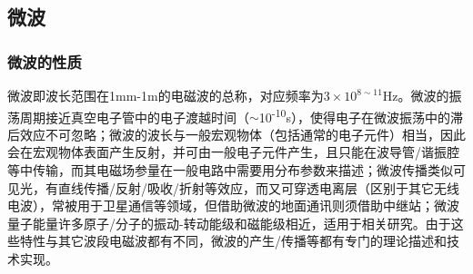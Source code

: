 \subsection{微波} %
	\label{sub:微波}
	\subsubsection{微波的性质} %
		\label{ssub:微波的性质}
		\par 微波即波长范围在1mm-1m的电磁波的总称，对应频率为$3\times 10^{8\sim 11}$Hz。微波的振荡周期接近真空电子管中的电子渡越时间（$\sim$10\textsuperscript{-10}s），使得电子在微波振荡中的滞后效应不可忽略；微波的波长与一般宏观物体（包括通常的电子元件）相当，因此会在宏观物体表面产生反射，并可由一般电子元件产生，且只能在波导管/谐振腔等中传输，而其电磁场参量在一般电路中需要用分布参数来描述；微波传播类似可见光，有直线传播/反射/吸收/折射等效应，而又可穿透电离层（区别于其它无线电波），常被用于卫星通信等领域，但借助微波的地面通讯则须借助中继站；微波量子能量许多原子/分子的振动-转动能级和磁能级相近，适用于相关研究。由于这些特性与其它波段电磁波都有不同，微波的产生/传播等都有专门的理论描述和技术实现。
